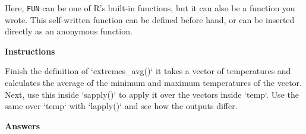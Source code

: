 \documentclass[]{article}
\newcommand{\hlstr}[1]{\textcolor[rgb]{0.251,0.627,0.251}{#1}}%
\newcommand{\hlstd}[1]{\textcolor[rgb]{0.251,0.251,0.251}{#1}}%
\newcommand{\hlkwc}[1]{\textcolor[rgb]{0.251,0.251,0.251}{#1}}%
\newenvironment{Shaded}{\begin{myshaded}}{\end{myshaded}}
\newcommand{\DataTypeTok}[1]{\hlkwc{#1}}
\newcommand{\StringTok}[1]{\hlstr{#1}}
\newcommand{\NormalTok}[1]{\hlstd{#1}}
\begin{document}
Here, \texttt{FUN} can be one of R's built-in functions, but it can also
be a function you wrote. This self-written function can be defined
before hand, or can be inserted directly as an anonymous function.

\textbf{Instructions}

\begin{Shaded}
\begin{Highlighting}[]
\OperatorTok{*}\StringTok{ }\NormalTok{Finish the definition of }\StringTok{`}\DataTypeTok{extremes_avg()}\StringTok{`}\OperatorTok{:}\StringTok{ }\NormalTok{it takes a vector of temperatures and calculates the average of the minimum and maximum temperatures of the vector.}
\OperatorTok{*}\StringTok{ }\NormalTok{Next, use this }\NormalTok{ inside }\StringTok{`}\DataTypeTok{sapply()}\StringTok{`}\NormalTok{ to apply it over the vectors inside }\StringTok{`}\DataTypeTok{temp}\StringTok{`}\NormalTok{.}
\OperatorTok{*}\StringTok{ }\NormalTok{Use the same }\NormalTok{ over }\StringTok{`}\DataTypeTok{temp}\StringTok{`}\NormalTok{ with }\StringTok{`}\DataTypeTok{lapply()}\StringTok{`}\NormalTok{ and see how the outputs differ.}
\end{Highlighting}
\end{Shaded}

\textbf{Answers}
\end{document}
